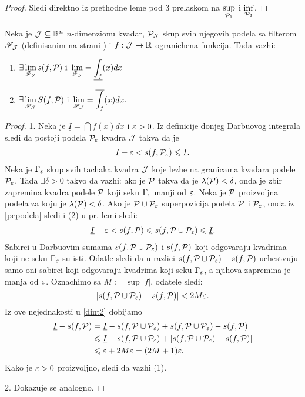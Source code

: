 \documentclass[../main.tex]{subfiles}
\begin{document}
    \begin{proof}
    	Sledi direktno iz prethodne leme pod 3 prelaskom na $\displaystyle{\sup_{\mathcal{P}_1}}$ i $\displaystyle{\inf_{\mathcal{P}_2}}$.
    \end{proof}

    \begin{te}
	Neka je $\mathcal{J}\subseteq \mathbb{R}^n$ $n$-dimenzionu kvadar, $\mathcal{P}_{\mathcal{J}}$ skup svih njegovih podela sa filterom $\mathscr{F}_{\mathcal{J}}$ (definisanim na strani \pageref{filterpodela}) i 
	$f: \mathcal{J} \to \mathbb{R}$ ogranichena funkcija. Tada vazhi:
	\begin{enumerate}
	    \item 
	    	$\displaystyle{\exists \lim_{\mathscr{F}_{\mathcal{J}}} s(f,\mathcal{P}) \text{ i } \lim_{\mathscr{F}_{\mathcal{J}}} = \underline{\int_{f}}(x)dx}$
	    \item 
	    	$\displaystyle{\exists \lim_{\mathscr{F}_{\mathcal{J}}} S(f,\mathcal{P}) \text{ i } \lim_{\mathscr{F}_{\mathcal{J}}} = \overline{\int_{f}}(x)dx}.$
	\end{enumerate}
    \end{te}

    \begin{proof}
    	1. Neka je $\underline{I} =  \dint f(x)dx$ i $\varepsilon>0$. Iz definicije donjeg Darbuovog integrala sledi da postoji podela $\mathcal{P}_\varepsilon$ kvadra $\mathcal{J}$
	takva da je  
	\begin{align}
	    \label{pepodela}
	    \underline{I}-\varepsilon < s(f,\mathcal{P}_\varepsilon)\leqslant \underline{I}.
	\end{align}
	Neka je $\Gamma_\varepsilon$ skup svih tachaka kvadra $\mathcal{J}$ koje lezhe na granicama kvadara podele $\mathcal{P}_\varepsilon$. 
	Tada $\exists\delta>0$ takvo da vazhi: ako je $\mathcal{P}$ takva da je $\lambda(\mathcal P)<\delta$, onda je zbir zapremina kvadra podele $\mathcal P$ koji seku
	$\Gamma_\varepsilon$ manji od $\varepsilon$.
	Neka je $\mathcal P$ proizvoljna podela za koju je $\lambda(\mathcal P) < \delta$. Ako je $\mathcal P \cup \mathcal{P}_\varepsilon$ superpozicija podela $\mathcal P$ i $\mathcal{P}_\varepsilon$, onda iz 
	\ref{pepodela} sledi i (2) u pr. lemi sledi:
	\[\]
	\begin{align}
	    \label{dint2}
	    \underline{I}-\varepsilon<s(f,\mathcal P)\leqslant s(f,\mathcal{P}\cup \mathcal{P}_\varepsilon)\leqslant \underline{I}.
	\end{align}
	Sabirci u Darbuovim sumama $s(f,\mathcal P \cup \mathcal{P}_\varepsilon)$ i $s(f,\mathcal{P})$ koji odgovaraju kvadrima koji ne seku $\Gamma_\varepsilon$ su isti. Odatle sledi da 
	u razlici $s(f,\mathcal{P}\cup \mathcal{P}_\varepsilon)- s(f,\mathcal P) $  uchestvuju samo oni sabirci koji odgovaraju kvadrima koji seku $\Gamma_\varepsilon$, a njihova zapremina
	je manja od $\varepsilon$.
	Oznachimo sa $M:=\sup |f|$, odatele sledi:
	\[|s(f,\mathcal{P}\cup \mathcal{P}_\varepsilon)- s(f,\mathcal P) |<2M\varepsilon.\]
	Iz ove nejednakosti u \ref{dint2} dobijamo 
	\begin{align*}
	    \underline{I} - s(f,\mathcal{P}) &= \underline{I} - s(f,\mathcal{P} \cup \mathcal{P}_\varepsilon) + s(f,\mathcal{P} \cup \mathcal{P}_\varepsilon) - s(f,\mathcal P)\\
	    &\leqslant \underline{I}  - s(f,\mathcal P \cup \mathcal{P}_\varepsilon) + |s(f,\mathcal P \cup \mathcal{P}_\varepsilon)- s(f,\mathcal P)|\\
	    &\leqslant \varepsilon + 2M\varepsilon = (2M+1)\varepsilon.
	\end{align*}
	Kako je $\varepsilon>0$ proizvoljno, sledi da vazhi (1).

	2. Dokazuje se analogno.
    \end{proof}
\end{document}
